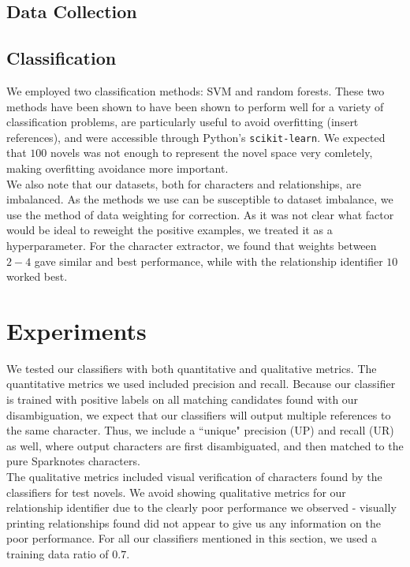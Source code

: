 \documentclass[12pt]{article}
\begin{document}
    \subsection{Data Collection}

    \subsection{Classification}

        We employed two classification methods: SVM and random forests. These
        two methods have been shown to have been shown to perform well for a variety of
        classification problems, are particularly useful to avoid overfitting (insert references),
        and were accessible through Python's \texttt{scikit-learn}.
        We expected that $100$ novels was not enough to represent the novel space very comletely,
        making overfitting avoidance more important. \\

        We also note that our datasets, both for characters and relationships, are imbalanced.
        As the methods we use can be susceptible to dataset imbalance, we use the method of
        data weighting for correction. As it was not clear what factor would be ideal to 
        reweight the positive examples, we treated it as a hyperparameter. For the character
        extractor, we found that weights between $2-4$ gave similar and best performance,
        while with the relationship identifier $10$ worked best.

\section{Experiments}

    We tested our classifiers with both quantitative and qualitative metrics. The quantitative
    metrics we used included precision and recall. Because our classifier is trained with positive 
    labels on all matching candidates found with our disambiguation, we expect that our classifiers 
    will output multiple references to the same character. Thus, we include a ``unique" precision (UP) 
    and recall (UR) as well, where output characters are first disambiguated, and then matched to
    the pure Sparknotes characters. \\
    
    The qualitative metrics included visual verification of characters found 
    by the classifiers for test novels. We avoid showing qualitative metrics for our 
    relationship identifier due to the clearly poor performance we observed - visually
    printing relationships found did not appear to give us any information on the poor performance. 
    For all our classifiers mentioned in this section, we used a training data ratio of $0.7$. 
\end{document}
